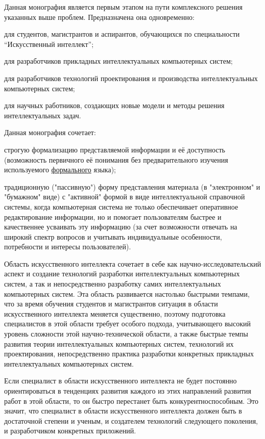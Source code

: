 \begin{SCn}
{Данная монография является первым этапом на пути комплексного решения указанных выше проблем.
Предназначена она одновременно:
\begin{scnitemize}
	\item для студентов, магистрантов и аспирантов, обучающихся по специальности ``Искусственный интеллект'';
	\item для разработчиков прикладных интеллектуальных компьютерных систем;
	\item для разработчиков технологий проектирования и производства интеллектуальных компьютерных систем;
	\item для научных работников, создающих новые модели и методы решения интеллектуальных задач.
\end{scnitemize}

Данная монография сочетает:
\begin{scnitemize}
	\item строгую формализацию представляемой информации и её доступность (возможность первичного её понимания без предварительного изучения используемого \uline{формального} языка);
	\item традиционную ("пассивную"{}) форму представления материала (в "электронном"{} и "бумажном"{} виде) с "активной"{} формой в виде интеллектуальной справочной системы, когда компьютерная система не только обеспечивает оперативное редактирование информации, но и помогает пользователям  быстрее и  качественнее усваивать эту информацию (за счет возможности отвечать на широкий спектр вопросов и учитывать индивидуальные особенности, потребности и интересы пользователей). 
\end{scnitemize}

	Область искусственного интеллекта сочетает в себе как  научно-исследовательский аспект и   создание технологий разработки интеллектуальных компьютерных систем, а так и непосредственно разработку самих интеллектуальных компьютерных систем. Эта область развивается настолько быстрыми темпами, что за время обучения студентов и магистрантов ситуация в области искусственного интеллекта меняется существенно, поэтому подготовка специалистов в этой области требует особого подхода, учитывающего высокий уровень сложности этой научно-технической области, а также быстрые темпы развития теории интеллектуальных компьютерных систем, технологий их проектирования, непосредственно практика разработки конкретных прикладных интеллектуальных компьютерных систем.
	
	Если специалист в области искусственного интеллекта не будет постоянно ориентироваться в тенденциях развития каждого из этих направлений развития работ в этой области, то он быстро перестанет быть конкурентноспособным. Это значит, что специалист в области искусственного интеллекта должен быть в достаточной степени и ученым, и создателем технологий следующего поколения, и разработчиком конкретных приложений.
	
}
\end{SCn}
